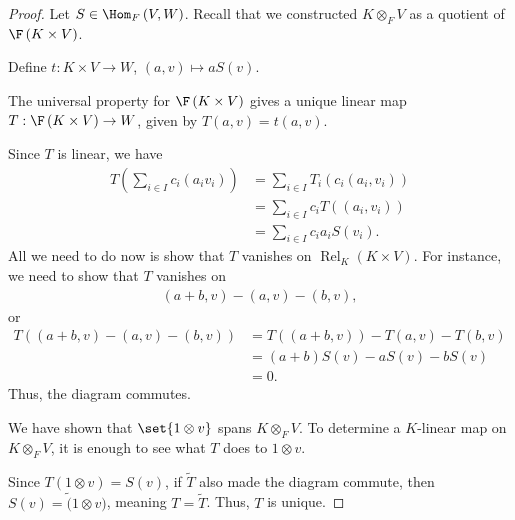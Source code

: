 \documentclass[10pt]{mypackage}
\begin{document}
  \begin{proof}
    Let $S\in \Hom_{F}\left(V,W\right)$. Recall that we constructed $K\otimes_{F}V$ as a quotient of $\F\left(K\times V\right)$.\newline

    Define $t: K\times V \rightarrow W$, $\left(a,v\right) \mapsto aS(v)$.\newline

    The universal property for $\F\left(K\times V\right)$ gives a unique linear map $T: \F\left(K\times V\right) \rightarrow W$, given by $T\left(a,v\right) = t\left(a,v\right)$.\newline

  Since $T$ is linear, we have
  \begin{align*}
    T\left(\sum_{i\in I}c_i\left(a_iv_i\right)\right) &= \sum_{i\in I}T_i\left(c_i\left(a_i,v_i\right)\right)\\
                                                      &= \sum_{i\in I}c_iT\left(\left(a_i,v_i\right)\right)\\
                                                      &= \sum_{i\in I}c_ia_iS\left(v_i\right).
  \end{align*}
  All we need to do now is show that $T$ vanishes on $\operatorname{Rel}_{K}\left(K\times V\right)$. For instance, we need to show that $T$ vanishes on
  \begin{align*}
    \left(a+b,v\right) - \left(a,v\right)-\left(b,v\right),
  \end{align*}
  or
  \begin{align*}
    T\left(\left(a + b,v\right)-\left(a,v\right) - \left(b,v\right)\right) &= T\left(\left(a+b,v\right)\right) - T\left(a,v\right) - T\left(b,v\right)\\
                                                                           &= \left(a+b\right)S(v) - aS(v) - bS(v)\\
                                                                           &= 0.
  \end{align*}
  Thus, the diagram commutes.\newline

  We have shown that $\set{1\otimes v}$ spans $K\otimes_{F}V$. To determine a $K$-linear map on $K\otimes_{F}V$, it is enough to see what $T$ does to $1\otimes v$.\newline

  Since $T\left(1\otimes v\right) = S(v)$, if $\widetilde{T}$ also made the diagram commute, then $S(v) = \widetilde(1\otimes v)$, meaning $T = \widetilde{T}$. Thus, $T$ is unique.
  \end{proof}
\end{document}
